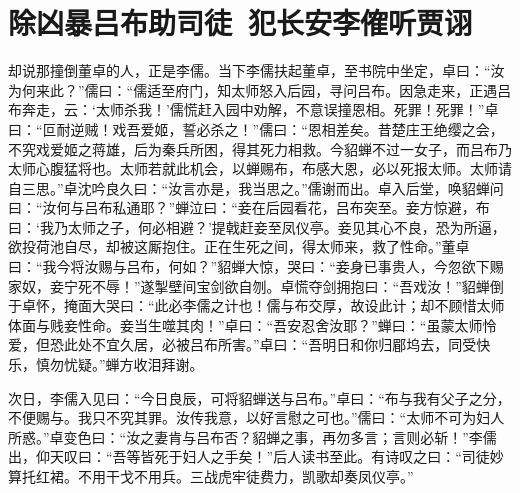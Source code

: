 \chapter{除凶暴吕布助司徒~犯长安李傕听贾诩}

却说那撞倒董卓的人，正是李儒。当下李儒扶起董卓，至书院中坐定，卓曰：“汝为何来此？”儒曰：“儒适至府门，知太师怒入后园，寻问吕布。因急走来，正遇吕布奔走，云：‘太师杀我！’儒慌赶入园中劝解，不意误撞恩相。死罪！死罪！”卓曰：“叵耐逆贼！戏吾爱姬，誓必杀之！”儒曰：“恩相差矣。昔楚庄王绝缨之会，不究戏爱姬之蒋雄，后为秦兵所困，得其死力相救。今貂蝉不过一女子，而吕布乃太师心腹猛将也。太师若就此机会，以蝉赐布，布感大恩，必以死报太师。太师请自三思。”卓沈吟良久曰：“汝言亦是，我当思之。”儒谢而出。卓入后堂，唤貂蝉问曰：“汝何与吕布私通耶？”蝉泣曰：“妾在后园看花，吕布突至。妾方惊避，布曰：‘我乃太师之子，何必相避？’提戟赶妾至凤仪亭。妾见其心不良，恐为所逼，欲投荷池自尽，却被这厮抱住。正在生死之间，得太师来，救了性命。”董卓曰：“我今将汝赐与吕布，何如？”貂蝉大惊，哭曰：“妾身已事贵人，今忽欲下赐家奴，妾宁死不辱！”遂掣壁间宝剑欲自刎。卓慌夺剑拥抱曰：“吾戏汝！”貂蝉倒于卓怀，掩面大哭曰：“此必李儒之计也！儒与布交厚，故设此计；却不顾惜太师体面与贱妾性命。妾当生噬其肉！”卓曰：“吾安忍舍汝耶？”蝉曰：“虽蒙太师怜爱，但恐此处不宜久居，必被吕布所害。”卓曰：“吾明日和你归郿坞去，同受快乐，慎勿忧疑。”蝉方收泪拜谢。

次日，李儒入见曰：“今日良辰，可将貂蝉送与吕布。”卓曰：“布与我有父子之分，不便赐与。我只不究其罪。汝传我意，以好言慰之可也。”儒曰：“太师不可为妇人所惑。”卓变色曰：“汝之妻肯与吕布否？貂蝉之事，再勿多言；言则必斩！”李儒出，仰天叹曰：“吾等皆死于妇人之手矣！”后人读书至此。有诗叹之曰：“司徒妙算托红裙。不用干戈不用兵。三战虎牢徒费力，凯歌却奏凤仪亭。”

